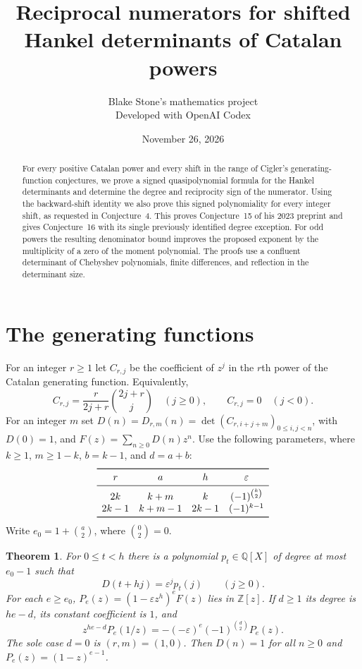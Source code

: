 \documentclass[11pt]{article}
\title{Reciprocal numerators for shifted Hankel determinants of Catalan powers}
\author{Blake Stone's mathematics project\\ \small Developed with OpenAI Codex}
\date{November 26, 2026}
\newtheorem{theorem}{Theorem}
\newcommand{\Z}{\mathbb Z}
\newcommand{\Q}{\mathbb Q}
\newcommand{\ee}{\varepsilon}
\begin{document}
\maketitle
\begin{abstract}
For every positive Catalan power and every shift in the range of Cigler's generating-function conjectures, we prove a signed quasipolynomial formula for the Hankel determinants and determine the degree and reciprocity sign of the numerator. Using the backward-shift identity we also prove this signed polynomiality for every integer shift, as requested in Conjecture~4. This proves Conjecture~15 of his 2023 preprint and gives Conjecture~16 with its single previously identified degree exception. For odd powers the resulting denominator bound improves the proposed exponent by the multiplicity of a zero of the moment polynomial. The proofs use a confluent determinant of Chebyshev polynomials, finite differences, and reflection in the determinant size.
\end{abstract}

\section{The generating functions}
For an integer $r\ge1$ let $C_{r,j}$ be the coefficient of $z^j$ in the $r$th power of the Catalan generating function. Equivalently,
\[
 C_{r,j}=\frac{r}{2j+r}\binom{2j+r}{j}\quad(j\ge0),
 \qquad C_{r,j}=0\quad(j<0).
\]
For an integer $m$ set $D(n)=D_{r,m}(n)=\det(C_{r,i+j+m})_{0\le i,j<n}$, with $D(0)=1$, and $F(z)=\sum_{n\ge0}D(n)z^n$.
Use the following parameters, where $k\ge1$, $m\ge1-k$, $b=k-1$, and $d=a+b$:
\[
\begin{array}{cccc}
\toprule
r & a & h & \ee\\\midrule
2k   & k+m   & k & (-1)^{\binom{k}{2}}\\
2k-1 & k+m-1 & 2k-1 & (-1)^{k-1}\\\bottomrule
\end{array}
\]
Write $e_0=1+\binom{a}{2}$, where $\binom{0}{2}=0$.
\begin{theorem}\label{thm}
For $0\le t<h$ there is a polynomial $p_t\in\Q[X]$ of degree at most $e_0-1$ such that
\[
 D(t+hj)=\ee^j p_t(j)\qquad(j\ge0).
\]
For each $e\ge e_0$, $P_e(z)=(1-\ee z^h)^e F(z)$ lies in $\Z[z]$. If $d\ge1$ its degree is $he-d$, its constant coefficient is $1$, and
\[
 z^{he-d}P_e(1/z)=-(-\ee)^e(-1)^{\binom{d}{2}}P_e(z).
\]
The sole case $d=0$ is $(r,m)=(1,0)$. Then $D(n)=1$ for all $n\ge0$ and $P_e(z)=(1-z)^{e-1}$.
\end{theorem}
\end{document}
